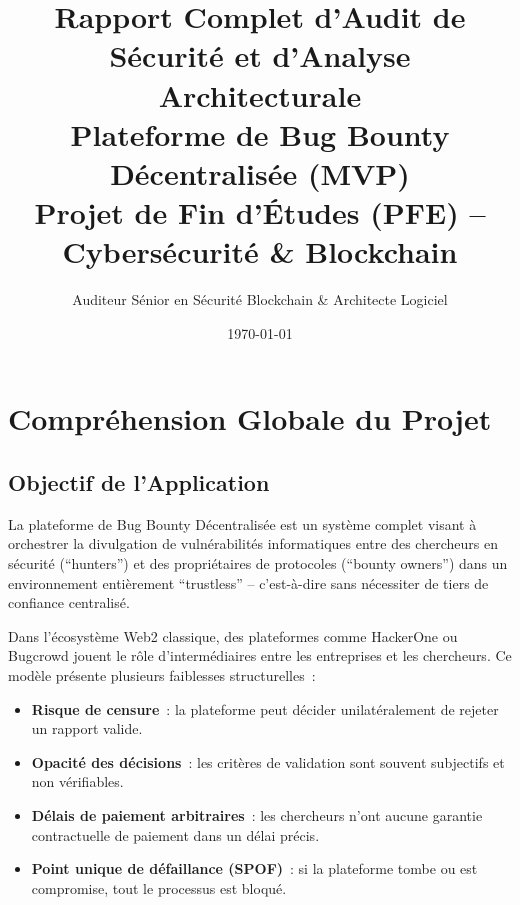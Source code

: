 \documentclass[12pt, a4paper]{report}
\title{
\vspace{-2cm}
\textbf{Rapport Complet d'Audit de S\'{e}curit\'{e} et d'Analyse Architecturale}\\[0.5cm]
\large Plateforme de Bug Bounty D\'{e}centralis\'{e}e (MVP)\\[0.3cm]
\normalsize Projet de Fin d'\'{E}tudes (PFE) -- Cybers\'{e}curit\'{e} \& Blockchain
}
\author{Auditeur S\'{e}nior en S\'{e}curit\'{e} Blockchain \& Architecte Logiciel}
\date{\today}
\begin{document}
\maketitle
\thispagestyle{empty}
\newpage

\tableofcontents
\newpage

\chapter{Compr\'{e}hension Globale du Projet}

\section{Objectif de l'Application}
La plateforme de Bug Bounty D\'{e}centralis\'{e}e est un syst\`{e}me complet visant \`{a} orchestrer la divulgation de vuln\'{e}rabilit\'{e}s informatiques entre des chercheurs en s\'{e}curit\'{e} (``hunters'') et des propri\'{e}taires de protocoles (``bounty owners'') dans un environnement enti\`{e}rement ``trustless'' -- c'est-\`{a}-dire sans n\'{e}cessiter de tiers de confiance centralis\'{e}.

Dans l'\'{e}cosyst\`{e}me Web2 classique, des plateformes comme HackerOne ou Bugcrowd jouent le r\^{o}le d'interm\'{e}diaires entre les entreprises et les chercheurs. Ce mod\`{e}le pr\'{e}sente plusieurs faiblesses structurelles~:
\begin{itemize}
    \item \textbf{Risque de censure}~: la plateforme peut d\'{e}cider unilat\'{e}ralement de rejeter un rapport valide.
    \item \textbf{Opacit\'{e} des d\'{e}cisions}~: les crit\`{e}res de validation sont souvent subjectifs et non v\'{e}rifiables.
    \item \textbf{D\'{e}lais de paiement arbitraires}~: les chercheurs n'ont aucune garantie contractuelle de paiement dans un d\'{e}lai pr\'{e}cis.
    \item \textbf{Point unique de d\'{e}faillance (SPOF)}~: si la plateforme tombe ou est compromise, tout le processus est bloqu\'{e}.
\end{itemize}
\end{document}

